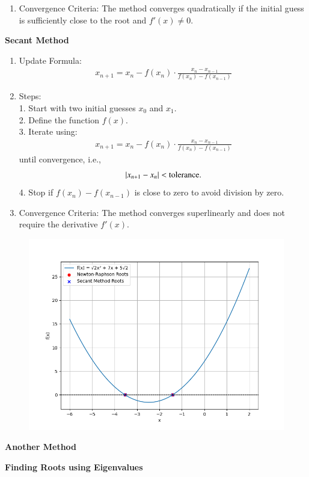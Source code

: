 \documentclass[journal]{IEEEtran}
\numberwithin{equation}{enumi}
\numberwithin{figure}{enumi}
\begin{document}
\begin{enumerate}
\begin{enumerate}
\item Convergence Criteria:
The method converges quadratically if the initial guess is sufficiently close to the root and  $f'(x) \neq 0 $.
\end{enumerate}

\textbf{Secant Method}
\begin{enumerate}
\item{Update Formula:}
\begin{align}
x_{n+1} = x_n - f(x_n) \cdot \frac{x_n - x_{n-1}}{f(x_n) - f(x_{n-1})}    
\end{align}


\item{Steps:}\\
1. Start with two initial guesses $x_0$  and $x_1$.\\
2. Define the function $f(x)$.\\
3. Iterate using:
   \begin{align}
   x_{n+1} = x_n - f(x_n) \cdot \frac{x_n - x_{n-1}}{f(x_n) - f(x_{n-1})}    
   \end{align}
   until convergence, i.e.,
   \begin{align}
   \left\vert x_{n+1} - x_n\right\vert < \text{tolerance}.
   \end{align}
4. Stop if $ f(x_n) - f(x_{n-1}) $ is close to zero to avoid division by zero.

\item{Convergence Criteria:}
The method converges superlinearly and does not require the derivative $ f'(x) $.


\end{enumerate}

\begin{figure}[h!]
   \centering
   \includegraphics[width=0.7\linewidth]{figs/Figure_1.png}
\end{figure}
\begin{center}
\textbf{Another Method}
\end{center}
\textbf{Finding Roots using Eigenvalues}\\




\end{enumerate}
\end{document}
